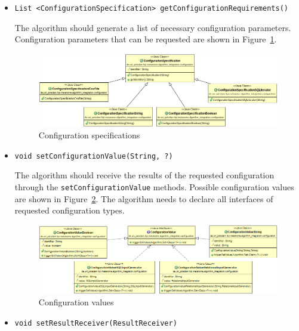 \documentclass[10pt,a4paper]{article}
\begin{document}
\begin{itemize}
\item \texttt{List <ConfigurationSpecification> getConfigurationRequirements()}

The algorithm should generate a list of necessary configuration parameters. Configuration parameters that can be requested are shown in Figure~\ref{fig_configurationSpecificationClass}.

\begin{figure}[h]
\includegraphics[width=\textwidth]{configurationSpecification_class}
\caption{Configuration specifications}
\label{fig_configurationSpecificationClass}
\end{figure}

\item \texttt{void setConfigurationValue(String, ?)}

The algorithm should receive the results of the requested configuration through the \texttt{setConfigurationValue} methods. Possible configuration values are shown in Figure~\ref{fig_configurationValueClass}. The algorithm needs to declare all interfaces of requested configuration types.

\begin{figure}[h]
\includegraphics[width=\textwidth]{configurationValue_class}
\caption{Configuration values}
\label{fig_configurationValueClass}
\end{figure}

\item \texttt{void setResultReceiver(ResultReceiver)}


\end{itemize}
\end{document}
